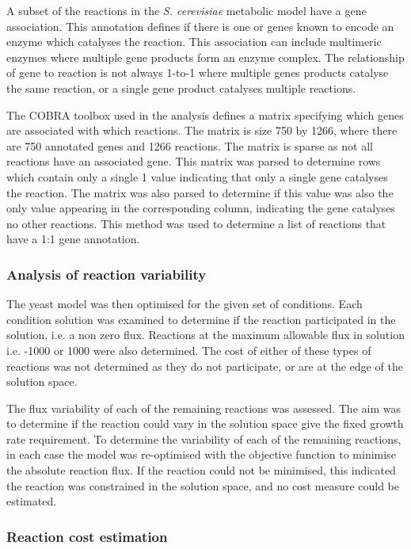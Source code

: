 A subset of the reactions in the \emph{S. cerevisiae} metabolic model have a gene association. This annotation defines if there is one or genes known to encode an enzyme which catalyses the reaction. This association can include multimeric enzymes where multiple gene products form an enzyme complex. The relationship of gene to reaction is not always 1-to-1 where multiple genes products catalyse the same reaction, or a single gene product catalyses multiple reactions. 

The COBRA toolbox used in the analysis defines a matrix specifying which genes are associated with which reactions. The matrix is size 750 by 1266, where there are 750 annotated genes and 1266 reactions. The matrix is sparse as not all reactions have an associated gene. This matrix was parsed to determine rows which contain only a single 1 value indicating that only a single gene catalyses the reaction. The matrix was also parsed to determine if this value was also the only value appearing in the corresponding column, indicating the gene catalyses no other reactions. This method was used to determine a list of reactions that have a 1:1 gene annotation.

\subsubsection{Analysis of reaction variability}

The yeast model was then optimised for the given set of conditions. Each condition solution was examined to determine if the reaction participated in the solution, i.e. a non zero flux. Reactions at the maximum allowable flux in solution i.e. -1000 or 1000 were also determined. The cost of either of these types of reactions was not determined as they do not participate, or are at the edge of the solution space.

The flux variability of each of the remaining reactions was assessed. The aim was to determine if the reaction could vary in the solution space give the fixed growth rate requirement. To determine the variability of each of the remaining reactions, in each case the model was re-optimised with the objective function to minimise the absolute reaction flux. If the reaction could not be minimised, this indicated the reaction was constrained in the solution space, and no cost measure could be estimated.

\subsubsection{Reaction cost estimation}

